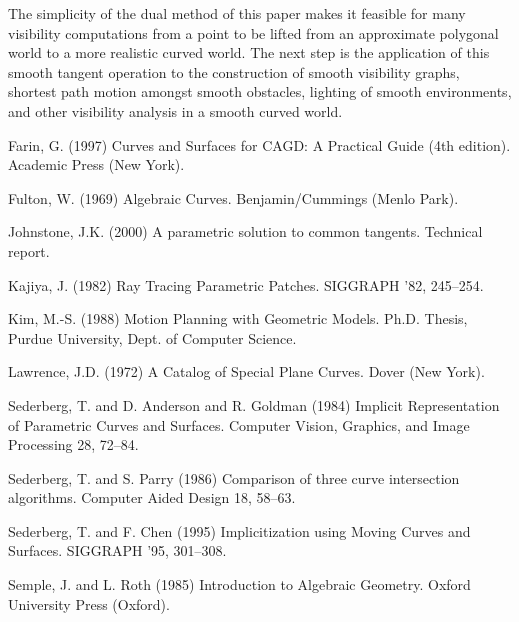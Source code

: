 \documentclass[11pt]{article}
\begin{document}
The simplicity of the dual method of this paper makes it feasible
for many visibility computations from a point to be lifted from an approximate
polygonal world to a more realistic curved world.
The next step is the application of this smooth tangent operation 
to the construction of smooth visibility graphs, shortest path motion
amongst smooth obstacles, lighting of smooth environments,
and other visibility analysis in a smooth curved world.


\begin{thebibliography}{Lozano-Perez 83}

Farin, G. (1997)
Curves and Surfaces for CAGD: A Practical Guide (4th edition).
Academic Press (New York).

Fulton, W. (1969)
Algebraic Curves.
Benjamin/Cummings (Menlo Park).

Johnstone, J.K. (2000)
A parametric solution to common tangents.
Technical report.

Kajiya, J. (1982)
Ray Tracing Parametric Patches.
SIGGRAPH '82, 245--254.

Kim, M.-S. (1988)
Motion Planning with Geometric Models.
Ph.D. Thesis, Purdue University, Dept. of Computer Science.

Lawrence, J.D. (1972)
A Catalog of Special Plane Curves.
Dover (New York).

Sederberg, T. and D. Anderson and R. Goldman (1984)
Implicit Representation of Parametric Curves and Surfaces.
Computer Vision, Graphics, and Image Processing 28, 72--84.

Sederberg, T. and S. Parry (1986)
Comparison of three curve intersection algorithms.
Computer Aided Design 18, 58--63.

Sederberg, T. and F. Chen (1995)
Implicitization using Moving Curves and Surfaces.
SIGGRAPH '95, 301--308.

Semple, J. and L. Roth (1985)
Introduction to Algebraic Geometry.
Oxford University Press (Oxford).

\end{thebibliography}
\end{document}
